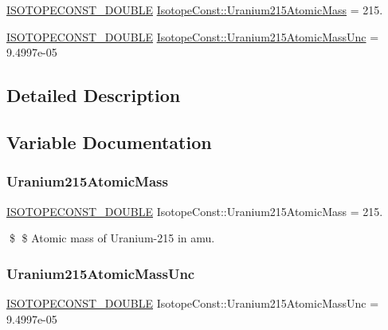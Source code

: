 \begin{DoxyCompactItemize}
\item 
\mbox{\hyperlink{group___isotope_const-_macros_ga8f45a7272ce02c0b4c65c44636ed719a}{I\+S\+O\+T\+O\+P\+E\+C\+O\+N\+S\+T\+\_\+\+D\+O\+U\+B\+LE}} \mbox{\hyperlink{group___isotope_const-_uranium-_u215_gafa3c8f6e874de6bd0114d4b359ad0280}{Isotope\+Const\+::\+Uranium215\+Atomic\+Mass}} = 215.
\item 
\mbox{\hyperlink{group___isotope_const-_macros_ga8f45a7272ce02c0b4c65c44636ed719a}{I\+S\+O\+T\+O\+P\+E\+C\+O\+N\+S\+T\+\_\+\+D\+O\+U\+B\+LE}} \mbox{\hyperlink{group___isotope_const-_uranium-_u215_gabf86a02e6b7aff62f8b59cf4a1d0c03e}{Isotope\+Const\+::\+Uranium215\+Atomic\+Mass\+Unc}} = 9.\+4997e-\/05
\end{DoxyCompactItemize}


\subsection{Detailed Description}


\subsection{Variable Documentation}
\mbox{\label{group___isotope_const-_uranium-_u215_gafa3c8f6e874de6bd0114d4b359ad0280}} 
\subsubsection{\texorpdfstring{Uranium215\+Atomic\+Mass}{Uranium215AtomicMass}}
{\footnotesize\ttfamily \mbox{\hyperlink{group___isotope_const-_macros_ga8f45a7272ce02c0b4c65c44636ed719a}{I\+S\+O\+T\+O\+P\+E\+C\+O\+N\+S\+T\+\_\+\+D\+O\+U\+B\+LE}} Isotope\+Const\+::\+Uranium215\+Atomic\+Mass = 215.}

\$ \$ Atomic mass of Uranium-\/215 in amu. \mbox{\label{group___isotope_const-_uranium-_u215_gabf86a02e6b7aff62f8b59cf4a1d0c03e}} 
\subsubsection{\texorpdfstring{Uranium215\+Atomic\+Mass\+Unc}{Uranium215AtomicMassUnc}}
{\footnotesize\ttfamily \mbox{\hyperlink{group___isotope_const-_macros_ga8f45a7272ce02c0b4c65c44636ed719a}{I\+S\+O\+T\+O\+P\+E\+C\+O\+N\+S\+T\+\_\+\+D\+O\+U\+B\+LE}} Isotope\+Const\+::\+Uranium215\+Atomic\+Mass\+Unc = 9.\+4997e-\/05}

